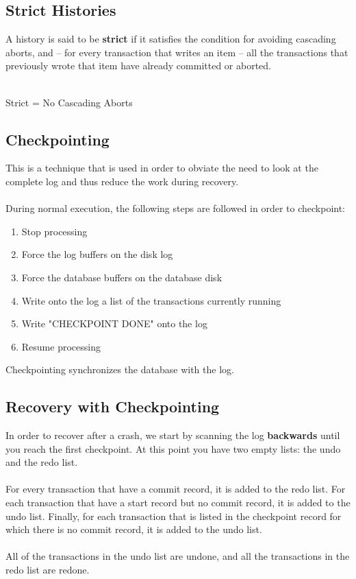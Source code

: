 \documentclass{article}
\begin{document}
\subsection{Strict Histories}
A history is said to be \textbf{strict} if it satisfies the condition for avoiding cascading aborts, and -- for every transaction that writes an item -- all the transactions that previously wrote that item have already committed or aborted. \\ \\
\centerline{Strict = No Cascading Aborts}

\subsection{Checkpointing}
This is a technique that is used in order to obviate the need to look at the complete log and thus reduce the work during recovery. \\ \\
During normal execution, the following steps are followed in order to checkpoint:

\begin{enumerate}
	\item Stop processing
	\item Force the log buffers on the disk log
	\item Force the database buffers on the database disk
	\item Write onto the log a list of the transactions currently running
	\item Write "CHECKPOINT DONE" onto the log
	\item Resume processing
\end{enumerate}
Checkpointing synchronizes the database with the log.

\subsection{Recovery with Checkpointing}
In order to recover after a crash, we start by scanning the log \textbf{backwards} until you reach the first checkpoint. At this point you have two empty lists: the undo and the redo list. \\ \\
For every transaction that have a commit record, it is added to the redo list. For each transaction that have a start record but no commit record, it is added to the undo list. Finally, for each transaction that is listed in the checkpoint record for which there is no commit record, it is added to the undo list. \\ \\
All of the transactions in the undo list are undone, and all the transactions in the redo list are redone.
\end{document}

